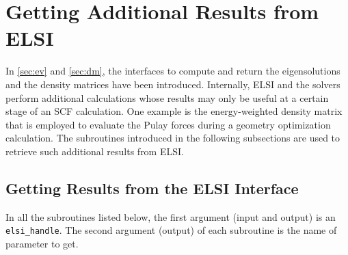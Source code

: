 \documentclass{report}
\begin{document}
\section{Getting Additional Results from ELSI}
\label{sec:getter}
In \ref{sec:ev} and \ref{sec:dm}, the interfaces to compute and return the eigensolutions and the density matrices have been introduced. Internally, ELSI and the solvers perform additional calculations whose results may only be useful at a certain stage of an SCF calculation. One example is the energy-weighted density matrix that is employed to evaluate the Pulay forces during a geometry optimization calculation. The subroutines introduced in the following subsections are used to retrieve such additional results from ELSI.

\subsection{Getting Results from the ELSI Interface}
\label{subsec:getter_elsi}
In all the subroutines listed below, the first argument (input and output) is an \texttt{elsi\_handle}. The second argument (output) of each subroutine is the name of parameter to get.
\end{document}

